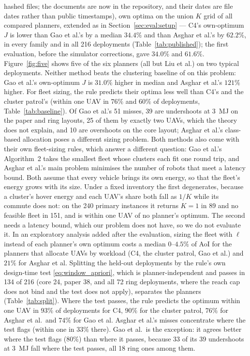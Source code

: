 \documentclass[journal,outdir=./]{IEEEtran}
\begin{document}
hashed files; the documents are now in the repository, and their dates are file dates rather than public timestamps), own optima on the union $K$ grid of all compared planners, extended as in Section~\ref{sec:eval:setup} --- C4's own-optimum $J$ is lower than Gao et al.'s by a median $34.4\%$ and than Asghar et al.'s by $62.2\%$, in every family and in all 216 deployments (Table~\ref{tab:published}); the first evaluation, before the simulator corrections, gave $34.0\%$ and $61.6\%$. Figure~\ref{fig:five} shows five of the six planners (all but Liu et al.) on two typical deployments. Neither method beats the clustering baseline of \cite{rahimi2024graph} on this problem: Gao et al.'s own-optimum $J$ is $31.0\%$ higher in median and Asghar et al.'s $121\%$ higher. For fleet sizing, the rule predicts their optima less well than C4's and the cluster patrol's (within one UAV in $76\%$ and $60\%$ of deployments, Table~\ref{tab:baseline}). Of Gao et al.'s 51 misses, 39 are undershoots at 3~MJ on the paper and ring layouts, 25 of them by exactly two UAVs, which the theory does not explain, and 10 are overshoots on the core layout; Asghar et al.'s class-based allocation poses a different sizing problem. Both methods also come with their own fleet-sizing rules, which answer a different question: Gao et al.'s Algorithm~2 takes the smallest fleet whose clusters each fit one round trip, and Asghar et al.'s main problem minimises the number of robots that meet a latency bound. Both assume that every vehicle brings its own energy, so that the fleet's energy grows with its size. Under a fixed inventory the first degenerates, because a cluster's hover energy and each UAV's share both fall as $1/K$ while its commute does not: on the 240 primary instances it returns $K=1$ in 89 and no feasible fleet in 151, and is within one UAV of no planner's optimum. The second needs a latency bound, which our problem does not have, so we do not evaluate it. In an exploratory analysis added after the evaluation, sizing the fleet with $\ell$ instead of each planner's own optimum costs a median $0$--$4.5\%$ of AoI for the planners that allocate UAVs by workload (C4, the cluster patrol, Gao et al.) and $21\%$ for Asghar et al. Splitting the held-out deployments by the rule's own design-time test \eqref{eq:window_apriori}, which is planner-independent and passes in 134 of 216 (core 24, paper 38, and all 72 ring deployments, where the reach cap does not bind and the test does not apply), separates the planners (Table~\ref{tab:split}). Where the test passes, the rule predicts the optimum within one UAV in $93\%$ of deployments for C4, $90\%$ for the cluster patrol, $76\%$ for Asghar et al.\ and $74\%$ for Gao et al. Asghar et al.'s misses concentrate where the test flags (within one in $33\%$ there). Gao et al.\ is the exception: it agrees better where the test flags ($80\%$) than where it passes, because 33 of its 39 undershoots at 3~MJ fall where the test passes, all 18 ring ones among them.
\end{document}
